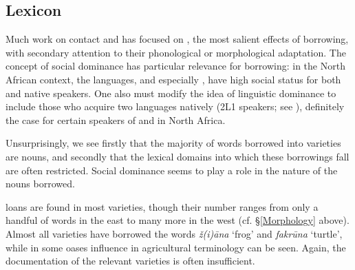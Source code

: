 \documentclass[output=paper]{langsci/langscibook}
\begin{document}
\subsection{Lexicon}\label{lexicon}

Much work on contact and   has focused on , the most salient effects of borrowing, with secondary attention to their phonological or morphological adaptation. The concept of social dominance has particular relevance for borrowing: in the North African context, the  languages, and especially , have high social status for both  and  native speakers. One also must modify the idea of linguistic dominance to include those who acquire two languages natively (2L1 speakers; see \citealt[525]{Lucas2015}), definitely the case for certain speakers of  and  in North Africa.

  Unsurprisingly, we see firstly that the majority of words borrowed into  varieties are nouns, and secondly that the lexical domains into which these borrowings fall are often restricted. Social dominance seems to play a role in the nature of the nouns borrowed.

   loans are found in most   varieties, though their number ranges from only a handful of words in the east to many more in the west (cf. §\ref{Morphology} above). Almost all  varieties have borrowed the words \textit{ž(i){\R}āna} ‘frog’ and \textit{fakrūna} ‘turtle’, while in some oases  influence in agricultural terminology can be seen. Again, the documentation of the relevant varieties is often insufficient.
\end{document}
